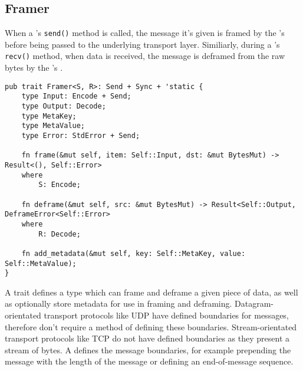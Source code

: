 \subsection{Framer}\label{subsec:framer}
When a \connection{}'s \texttt{send()} method is called, the message it's given is framed by the \connection{}'s
\framer{} before being passed to the underlying transport layer.
Similiarly, during a \connection{}'s \texttt{recv()} method, when data is received, the message is deframed from the
raw bytes by the \connection{}'s \framer{}.
\begin{lstlisting}[float=h, label=lst:framer, caption={The Framer trait, showing the Send and 'static
requirements for all implementers, and associated types.}]
pub trait Framer<S, R>: Send + Sync + 'static {
    type Input: Encode + Send;
    type Output: Decode;
    type MetaKey;
    type MetaValue;
    type Error: StdError + Send;

    fn frame(&mut self, item: Self::Input, dst: &mut BytesMut) -> Result<(), Self::Error>
    where
        S: Encode;

    fn deframe(&mut self, src: &mut BytesMut) -> Result<Self::Output, DeframeError<Self::Error>
    where
        R: Decode;

    fn add_metadata(&mut self, key: Self::MetaKey, value: Self::MetaValue);
}
\end{lstlisting}

A \framer{} trait defines a type which can frame and deframe a given piece of data, as well as optionally store
metadata for use in framing and deframing.
Datagram-orientated transport protocols like UDP have defined boundaries for messages, therefore don't require a method
of defining these boundaries.
Stream-orientated transport protocols like TCP do not have defined boundaries as they present a stream of bytes.
A \framer{} defines the message boundaries, for example prepending the message with the length of the message or
defining an end-of-message sequence.


